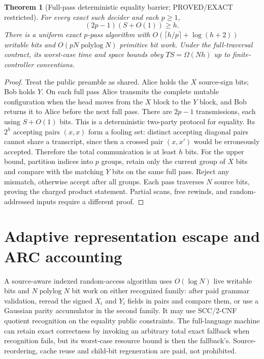 \documentclass[11pt]{article}
\newtheorem{theorem}{Theorem}
\begin{document}
\begin{theorem}[Full-pass deterministic equality barrier; PROVED/EXACT restricted]
For every exact such decider and each $p\ge1$,
\[
 (2p-1)(S+O(1))\ge h.
\tag{6}
\]
There is a uniform exact $p$-pass algorithm with $O(\lceil h/p\rceil+\log(h+2))$ writable bits and $O(pN\operatorname{polylog}N)$ primitive bit work. Under the full-traversal contract, its worst-case time and space bounds obey $TS=\Omega(Nh)$ up to finite-controller conventions.
\end{theorem}
\begin{proof}
Treat the public preamble as shared. Alice holds the $X$ source-sign bits; Bob holds $Y$. On each full pass Alice transmits the complete mutable configuration when the head moves from the $X$ block to the $Y$ block, and Bob returns it to Alice before the next full pass. There are $2p-1$ transmissions, each using $S+O(1)$ bits. This is a deterministic two-party protocol for equality. Its $2^h$ accepting pairs $(x,x)$ form a fooling set: distinct accepting diagonal pairs cannot share a transcript, since then a crossed pair $(x,x')$ would be erroneously accepted. Therefore the total communication is at least $h$ bits. For the upper bound, partition indices into $p$ groups, retain only the current group of $X$ bits and compare with the matching $Y$ bits on the same full pass. Reject any mismatch, otherwise accept after all groups. Each pass traverses $N$ source bits, proving the charged product statement. Partial scans, free rewinds, and random-addressed inputs require a different proof.
\end{proof}

\section{Adaptive representation escape and ARC accounting}
A source-aware indexed random-access algorithm uses $O(\log N)$ live writable bits and $N\operatorname{polylog}N$ bit work on either recognized family: after paid grammar validation, reread the signed $X_i$ and $Y_i$ fields in pairs and compare them, or use a Gaussian parity accumulator in the second family. It may use SCC/2-CNF quotient recognition on the equality public constraints. The full-language machine can retain exact correctness by invoking an arbitrary total exact fallback when recognition fails, but its worst-case resource bound is then the fallback's. Source-reordering, cache reuse and child-bit regeneration are paid, not prohibited.
\end{document}
